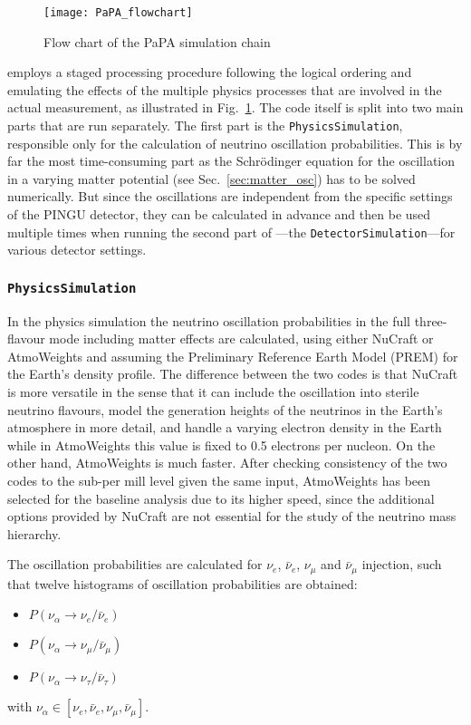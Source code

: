 \begin{figure}
\centering
 \texttt{[image: PaPA\_flowchart]}
 \caption{Flow chart of the PaPA simulation chain}
\label{fig:papa_flowchart}
\end{figure}

\papa employs a staged processing procedure following the logical ordering and 
emulating the effects of the multiple physics processes that are involved in 
the actual measurement, as illustrated in Fig.~\ref{fig:papa_flowchart}. The 
code itself is split into two main parts that are run separately. The first 
part is the \texttt{PhysicsSimulation}, responsible only for the calculation of 
neutrino oscillation probabilities. This is by far the most time-consuming part 
as the Schr\"odinger equation for the oscillation in a varying matter 
potential (see Sec.~\ref{sec:matter_osc}) has to be solved numerically. But 
since the oscillations are independent from the specific settings of the PINGU 
detector, they can be calculated in advance and then be used multiple times 
when running the second part of \papa---the \texttt{DetectorSimulation}---for 
various detector settings.


\subsubsection{\texttt{PhysicsSimulation}}

In the physics simulation the neutrino oscillation probabilities in
the full three-flavour mode including matter effects are calculated, using
either NuCraft \cite{NuCraft} or AtmoWeights \cite{AtmoWeights} and assuming
the Preliminary Reference Earth Model (PREM) \cite{PREM} for the Earth's density
profile. The difference
between the two codes is that NuCraft is more versatile in the sense that it
can include the oscillation into sterile neutrino flavours, model the
generation heights of the neutrinos in the Earth's atmosphere in more detail,
and handle a varying electron density in the Earth while in AtmoWeights this
value is fixed to 0.5 electrons per nucleon. On the other hand, AtmoWeights is
much faster. After checking consistency of the two codes to the sub-per mill
level given the same input, AtmoWeights has been selected for the baseline
analysis due to its higher speed, since the additional options provided by
NuCraft are not essential for the study of the neutrino mass hierarchy.

The oscillation probabilities are calculated for $\nu_e$, $\bar\nu_e$, $\nu_\mu$
and $\bar\nu_\mu$ injection, such that twelve histograms of oscillation
probabilities are obtained:
\begin{itemize}
 \item $P(\nu_\alpha \to \nu_e/\bar\nu_e)$
 \item $P(\nu_\alpha \to \nu_\mu/\bar\nu_\mu)$
 \item $P(\nu_\alpha \to \nu_\tau/\bar\nu_\tau)$
\end{itemize}
with $\nu_\alpha \in \left[\nu_e,\bar\nu_e,\nu_\mu,\bar\nu_\mu\right]$.

